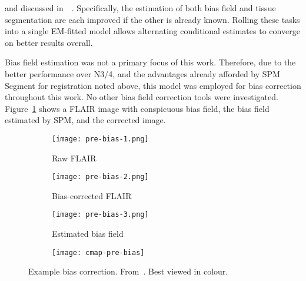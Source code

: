 and discussed in~~\cite{Ashburner2005}.
Specifically, the estimation of both bias field and tissue segmentation are each improved
if the other is already known.
Rolling these tasks into a single EM-fitted model allows
alternating conditional estimates to converge on better results overall.
\par
Bias field estimation was not a primary focus of this work.
Therefore, due to the better performance over N3/4,
and the advantages already afforded by SPM Segment for registration noted above,
this model was employed for bias correction throughout this work.
No other bias field correction tools were investigated.
Figure~\ref{fig:pre-bias} shows a FLAIR image with conspicuous bias field,
the bias field estimated by SPM, and the corrected image.
\par
\begin{figure}
  \centering
  \begin{subfigure}{0.3\textwidth}
    \centering
    \texttt{[image: pre-bias-1.png]}
    \caption{Raw FLAIR}
  \end{subfigure}
  \begin{subfigure}{0.3\textwidth}
    \centering
    \texttt{[image: pre-bias-2.png]}
    \caption{Bias-corrected FLAIR}
  \end{subfigure}
  \begin{subfigure}{0.30\textwidth}
    \centering
    \texttt{[image: pre-bias-3.png]}
    \caption{Estimated bias field}
  \end{subfigure}
  \begin{subfigure}{0.04\textwidth}
    \texttt{[image: cmap-pre-bias]}
    \\\vphantom{(x)}
  \end{subfigure}
  \caption{Example bias correction. From~\cite{WMHSEG2017}. Best viewed in colour.}%
  \label{fig:pre-bias}
\end{figure}
